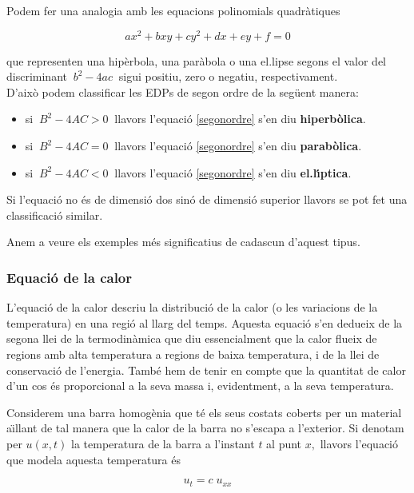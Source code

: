 \documentclass[12pt]{article}
\begin{document}
Podem fer una analogia amb les equacions polinomials quadr{\`a}tiques

\[
 a x^2+bxy+c y^2+dx+ey+f=0
\]

que representen una hip{\`e}rbola,  una par{\`a}bola o una  el.lipse segons el valor del discriminant  $\ b^2-4ac\ $  sigui positiu, zero o negatiu, respectivament.\\

D'aix{\`o} podem classificar les EDPs de segon ordre de la seg{\"u}ent manera:
\vspace{0.4cm}
\begin{itemize}
\item si $\ B^2-4AC>0\ $ llavors l'equaci{\'o} \eqref{segonordre} s'en diu \textbf{hiperb{\`o}lica}.
\item si $\ B^2-4AC=0\ $ llavors l'equaci{\'o} \eqref{segonordre} s'en diu \textbf{parab{\`o}lica}.
\item si $\ B^2-4AC<0\ $ llavors l'equaci{\'o} \eqref{segonordre} s'en diu \textbf{el.l{\'\i}ptica}.
\end{itemize}

Si l'equaci{\'o} no {\'e}s de dimensi{\'o} dos sin{\'o} de dimensi{\'o} superior llavors se pot fet una classificaci{\'o} similar.

Anem a veure els exemples m{\'e}s significatius de cadascun d'aquest tipus.


\subsubsection{Equaci{\'o} de la calor}

L'equaci{\'o} de la calor descriu la distribuci{\'o} de la calor (o les variacions de la temperatura)
en una regi{\'o} al llarg del temps. Aquesta equaci{\'o} s'en dedueix de la segona llei de la termodin{\`a}mica que diu essencialment que la calor flueix de regions amb alta temperatura a regions de baixa temperatura, i de la llei de conservaci{\'o} de l'energia. Tamb{\'e} hem de tenir en compte que la quantitat de calor d'un cos {\'e}s proporcional a la seva massa i, evidentment, a la seva temperatura.

Considerem una barra homog{\`e}nia que t{\'e} els seus costats coberts per un material a{\"\i}llant de tal manera que la calor de la barra no s'escapa a l'exterior. Si denotam per $u(x,t)$ la temperatura de la barra a l'instant $t$
al punt $x,$ llavors l'equaci{\'o} que modela aquesta temperatura {\'e}s

\[
 u_t=c\;u_{xx}
\]
\end{document}
